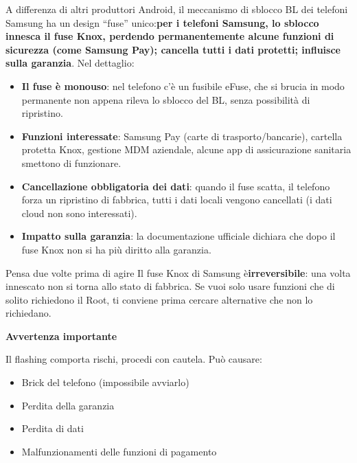 
A differenza di altri produttori Android, il meccanismo di sblocco BL dei telefoni Samsung ha un design “fuse” unico:\textbf{per i telefoni Samsung, lo sblocco innesca il fuse Knox, perdendo permanentemente alcune funzioni di sicurezza (come Samsung Pay); cancella tutti i dati protetti; influisce sulla garanzia}. Nel dettaglio:

\begin{itemize}
  \item \textbf{Il fuse è monouso}: nel telefono c'è un fusibile eFuse, che si brucia in modo permanente non appena rileva lo sblocco del BL, senza possibilità di ripristino.
  \item \textbf{Funzioni interessate}: Samsung Pay (carte di trasporto/bancarie), cartella protetta Knox, gestione MDM aziendale, alcune app di assicurazione sanitaria smettono di funzionare.
  \item \textbf{Cancellazione obbligatoria dei dati}: quando il fuse scatta, il telefono forza un ripristino di fabbrica, tutti i dati locali vengono cancellati (i dati cloud non sono interessati).
  \item \textbf{Impatto sulla garanzia}: la documentazione ufficiale dichiara che dopo il fuse Knox non si ha più diritto alla garanzia.
\end{itemize}

\begin{tcbwarn}{Pensa due volte prima di agire}
Il fuse Knox di Samsung è\textbf{irreversibile}: una volta innescato non si torna allo stato di fabbrica. Se vuoi solo usare funzioni che di solito richiedono il Root, ti conviene prima cercare alternative che non lo richiedano.

\end{tcbwarn}

\textbf{Avvertenza importante}\par

Il flashing comporta rischi, procedi con cautela. Può causare:

\begin{itemize}
  \item Brick del telefono (impossibile avviarlo)
  \item Perdita della garanzia
  \item Perdita di dati
  \item Malfunzionamenti delle funzioni di pagamento
\end{itemize}

